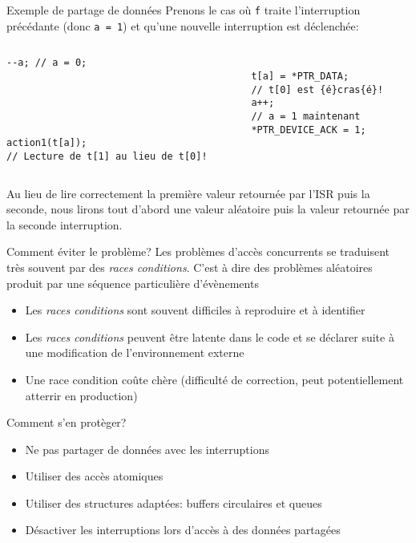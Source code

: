 \begin{frame}[fragile]{Exemple de partage de données}
  Prenons le  cas où  \verb+f+ traite l'interruption  précédante (donc
  \verb+a = 1+) et qu'une nouvelle interruption est déclenchée:
  \begin{columns}
    \begin{column}{5cm}
      \begin{lstlisting}[showlines=true,emptylines=10]
--a; // a = 0;





action1(t[a]);
// Lecture de t[1] au lieu de t[0]!
       \end{lstlisting}
     \end{column}
     \begin{column}{5cm}
      \begin{lstlisting}[showlines=true,emptylines=10,escapeinside=\{\}]

t[a] = *PTR_DATA; 
// t[0] est {é}cras{é}!
a++;
// a = 1 maintenant
*PTR_DEVICE_ACK = 1;


       \end{lstlisting}
    \end{column}
  \end{columns}
  Au lieu de lire correctement  la première valeur retournée par l'ISR
  puis la seconde, nous lirons  tout d'abord une valeur aléatoire puis
  la valeur retournée par la seconde interruption.
\end{frame} 

\begin{frame}{Comment éviter le problème?}
  Les problèmes d'accès concurrents se traduisent très souvent par des
  \emph{races  conditions}.   C'est à  dire  des problèmes  aléatoires
  produit par une séquence particulière d'évènements
  \begin{itemize} 
  \item   Les  \emph{races  conditions}   sont  souvent   difficiles  à
    reproduire et à identifier
  \item Les  \emph{races conditions} peuvent être latente  dans le code
    et se déclarer suite à une modification de l'environnement externe
  \item Une race condition coûte chère (difficulté de correction, peut
    potentiellement atterrir en production)
  \end{itemize} 
  Comment s'en protèger?
  \begin{itemize} 
  \item  Ne  pas  partager de données avec les interruptions
  \item Utiliser des accès atomiques
  \item  Utiliser  des  structures  adaptées: buffers  circulaires  et
    queues
  \item  Désactiver  les  interruptions  lors  d'accès  à  des  données
    partagées
  \end{itemize} 
\end{frame} 

